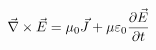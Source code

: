 \documentclass[preview]{standalone}
\begin{document}
\begin{align*}
\special{dvisvgm:raw <g id='unique000'>}\vec{\nabla} \times \vec{E} = \mu_0 \vec{J} + \mu \varepsilon_0 \frac{\partial \vec{E}}{\partial t}\special{dvisvgm:raw </g>}
\end{align*}
\end{document}
